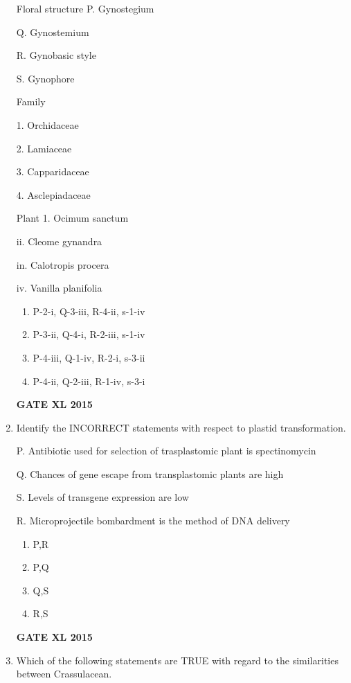 \documentclass[journal,12pt,onecolumn]{IEEEtran}
\begin{document}
\begin{enumerate}
\begin{minipage}{0.3\textwidth}
	\begin{flushleft}
Floral structure
P. Gynostegium

Q. Gynostemium

R. Gynobasic style

S. Gynophore

	\end{flushleft}
\end{minipage}
\begin{minipage}{0.3\textwidth}
	\begin{flushleft}
Family


1. Orchidaceae

2. Lamiaceae

3. Capparidaceae

4. Asclepiadaceae

	\end{flushleft}
\end{minipage}
\begin{minipage}{0.3\textwidth}
	\begin{flushleft}
Plant
1. Ocimum sanctum

ii. Cleome gynandra

in. Calotropis procera

iv. Vanilla planifolia
	\end{flushleft}
\end{minipage}
    \begin{enumerate}
	\item P-2-i, Q-3-iii, R-4-ii, s-1-iv            
	\item P-3-ii, Q-4-i, R-2-iii, s-1-iv            
	\item P-4-iii, Q-1-iv, R-2-i, s-3-ii            
	\item P-4-ii, Q-2-iii, R-1-iv, s-3-i            
    \end{enumerate}
\hfill{\textbf{GATE XL 2015}}
\item  Identify the INCORRECT statements with respect to plastid transformation.

P. Antibiotic used for selection of trasplastomic plant is spectinomycin

Q. Chances of gene escape from transplastomic plants are high

S. Levels of transgene expression are low

R. Microprojectile bombardment is the method of DNA delivery
    \begin{enumerate}
            \item P,R
	    \item P,Q
	    \item Q,S
            \item R,S
    \end{enumerate}
\hfill{\textbf{GATE XL 2015}}
\item Which of the following statements are TRUE with regard to the similarities between Crassulacean.


\end{enumerate}
\end{document}

